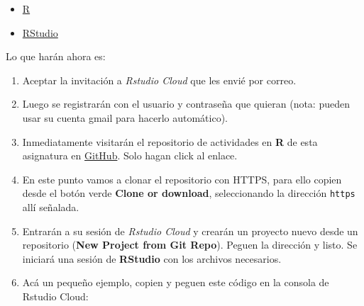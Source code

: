 \documentclass[
]{article}
\providecommand{\tightlist}{%
  \setlength{\itemsep}{0pt}\setlength{\parskip}{0pt}}
\begin{document}
\begin{itemize}
\tightlist
\item
  \href{https://www.r-project.org/}{R}
\item
  \href{https://rstudio.com/}{RStudio}
\end{itemize}

Lo que harán ahora es:

\begin{enumerate}
\def\labelenumi{\arabic{enumi}.}
\tightlist
\item
  Aceptar la invitación a \emph{Rstudio Cloud} que les envié por correo.
\item
  Luego se registrarán con el usuario y contraseña que quieran (nota:
  pueden usar su cuenta gmail para hacerlo automático).
\item
  Inmediatamente visitarán el repositorio de actividades en \textbf{R}
  de esta asignatura en
  \href{https://github.com/edlinguerra/LCA-ME}{GitHub}. Solo hagan click
  al enlace.
\item
  En este punto vamos a clonar el repositorio con HTTPS, para ello
  copien desde el botón verde \textbf{Clone or download}, seleccionando
  la dirección \texttt{https} allí señalada.
\item
  Entrarán a su sesión de \emph{Rstudio Cloud} y crearán un proyecto
  nuevo desde un repositorio (\textbf{New Project from Git Repo}).
  Peguen la dirección y listo. Se iniciará una sesión de
  \textbf{RStudio} con los archivos necesarios.\\
\item
  Acá un pequeño ejemplo, copien y peguen este código en la consola de
  Rstudio Cloud:
\end{enumerate}
\end{document}
